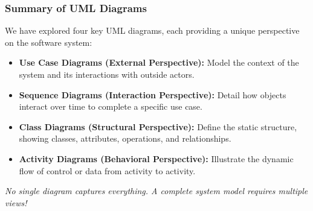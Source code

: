 \documentclass[xcolor=table]{beamer}
\begin{document}
    
    
    



\begin{frame}
    \frametitle{Summary of UML Diagrams}
    We have explored four key UML diagrams, each providing a unique perspective on the software system:
    
    \vspace{0.3cm}
    \begin{itemize}
        \item \textbf{Use Case Diagrams (External Perspective):} Model the context of the system and its interactions with outside actors.
        \item \textbf{Sequence Diagrams (Interaction Perspective):} Detail how objects interact over time to complete a specific use case.
        \item \textbf{Class Diagrams (Structural Perspective):} Define the static structure, showing classes, attributes, operations, and relationships.
        \item \textbf{Activity Diagrams (Behavioral Perspective):} Illustrate the dynamic flow of control or data from activity to activity.
    \end{itemize}
    
    \vspace{0.3cm}
    \textit{No single diagram captures everything. A complete system model requires multiple views!}
\end{frame}
\end{document}
